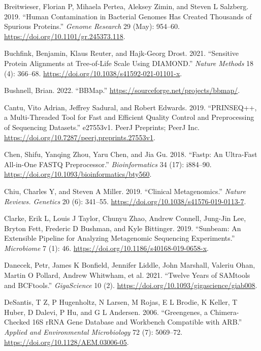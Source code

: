 \documentclass[
]{article}
\newlength{\cslhangindent}
\newlength{\cslentryspacingunit} %
\newenvironment{CSLReferences}[2] %
 {%
  \setlength{\parindent}{0pt}
  \ifodd #1
  \let\oldpar\par
  \def\par{\hangindent=\cslhangindent\oldpar}
  \fi
  \setlength{\parskip}{#2\cslentryspacingunit}
 }%
 {}
\begin{document}
\begin{CSLReferences}{1}{0}
\leavevmode{}%
Breitwieser, Florian P, Mihaela Pertea, Aleksey Zimin, and Steven L
Salzberg. 2019. {``Human Contamination in Bacterial Genomes Has Created
Thousands of Spurious Proteins.''} \emph{Genome Research} 29 (May):
954--60. \url{https://doi.org/10.1101/gr.245373.118}.

\leavevmode{}%
Buchfink, Benjamin, Klaus Reuter, and Hajk-Georg Drost. 2021.
{``Sensitive Protein Alignments at Tree-of-Life Scale Using
{DIAMOND}.''} \emph{Nature Methods} 18 (4): 366--68.
\url{https://doi.org/10.1038/s41592-021-01101-x}.

\leavevmode{}%
Bushnell, Brian. 2022. {``{BBMap}.''}
\url{https://sourceforge.net/projects/bbmap/}.

\leavevmode{}%
Cantu, Vito Adrian, Jeffrey Sadural, and Robert Edwards. 2019.
{``{PRINSEQ++}, a Multi-Threaded Tool for Fast and Efficient Quality
Control and Preprocessing of Sequencing Datasets.''} e27553v1. PeerJ
Preprints; PeerJ Inc.
\url{https://doi.org/10.7287/peerj.preprints.27553v1}.

\leavevmode{}%
Chen, Shifu, Yanqing Zhou, Yaru Chen, and Jia Gu. 2018. {``Fastp: An
Ultra-Fast All-in-One {FASTQ} Preprocessor.''} \emph{Bioinformatics} 34
(17): i884--90. \url{https://doi.org/10.1093/bioinformatics/bty560}.

\leavevmode{}%
Chiu, Charles Y, and Steven A Miller. 2019. {``Clinical Metagenomics.''}
\emph{Nature Reviews. Genetics} 20 (6): 341--55.
\url{https://doi.org/10.1038/s41576-019-0113-7}.

\leavevmode{}%
Clarke, Erik L, Louis J Taylor, Chunyu Zhao, Andrew Connell, Jung-Jin
Lee, Bryton Fett, Frederic D Bushman, and Kyle Bittinger. 2019.
{``Sunbeam: An Extensible Pipeline for Analyzing Metagenomic Sequencing
Experiments.''} \emph{Microbiome} 7 (1): 46.
\url{https://doi.org/10.1186/s40168-019-0658-x}.

\leavevmode{}%
Danecek, Petr, James K Bonfield, Jennifer Liddle, John Marshall, Valeriu
Ohan, Martin O Pollard, Andrew Whitwham, et al. 2021. {``Twelve Years of
{SAMtools} and {BCFtools}.''} \emph{GigaScience} 10 (2).
\url{https://doi.org/10.1093/gigascience/giab008}.

\leavevmode{}%
DeSantis, T Z, P Hugenholtz, N Larsen, M Rojas, E L Brodie, K Keller, T
Huber, D Dalevi, P Hu, and G L Andersen. 2006. {``Greengenes, a
Chimera-Checked {16S} {rRNA} Gene Database and Workbench Compatible with
{ARB}.''} \emph{Applied and Environmental Microbiology} 72 (7):
5069--72. \url{https://doi.org/10.1128/AEM.03006-05}.


\end{CSLReferences}
\end{document}
